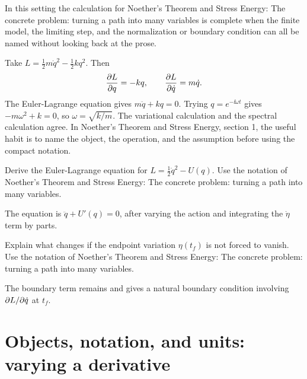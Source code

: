 In this setting the calculation for Noether's Theorem and Stress Energy: The concrete problem: turning a path into many variables is complete when the finite model, the limiting step, and the normalization or boundary condition can all be named without looking back at the prose.




\begin{example}
Take \(L=\frac12m\dot q^2-\frac12kq^2\).  Then
\[
  \frac{\partial L}{\partial q}=-kq,\qquad \frac{\partial L}{\partial\dot q}=m\dot q.
\]
The Euler-Lagrange equation gives \(m\ddot q+kq=0\).  Trying \(q=e^{-\ii\omega t}\) gives \(-m\omega^2+k=0\), so \(\omega=\sqrt{k/m}\).  The variational calculation and the spectral calculation agree.  In Noether's Theorem and Stress Energy, section 1, the useful habit is to name the object, the operation, and the assumption before using the compact notation.
\end{example}



\begin{exercise}
Derive the Euler-Lagrange equation for \(L=\frac12\dot q^2-U(q)\).  Use the notation of Noether's Theorem and Stress Energy: The concrete problem: turning a path into many variables.
\begin{answer}
The equation is \(\ddot q+U'(q)=0\), after varying the action and integrating the \(\dot\eta\) term by parts.
\end{answer}
\end{exercise}

\begin{exercise}
Explain what changes if the endpoint variation \(\eta(t_f)\) is not forced to vanish.  Use the notation of Noether's Theorem and Stress Energy: The concrete problem: turning a path into many variables.
\begin{answer}
The boundary term remains and gives a natural boundary condition involving \(\partial L/\partial\dot q\) at \(t_f\).
\end{answer}
\end{exercise}



\section{Objects, notation, and units: varying a derivative}













